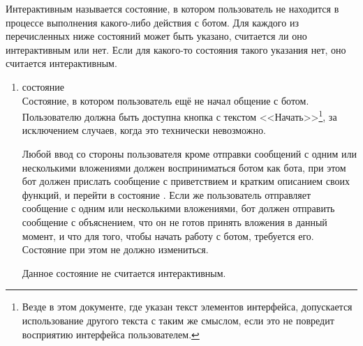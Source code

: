    Интерактивным называется состояние, в котором пользователь не находится в процессе выполнения
    какого-либо действия с ботом. Для каждого из перечисленных ниже состояний может быть указано,
    считается ли оно интерактивным или нет. Если для какого-то состояния такого указания нет,
    оно считается интерактивным.
    \begin{enumerate}
        \item \label{itm:req:ui:states:init}
             состояние \\
            Состояние, в котором пользователь ещё не начал общение с ботом.
            Пользователю должна быть доступна кнопка с текстом <<Начать>>\footnote{
            Везде в этом документе, где указан текст элементов интерфейса, допускается
            использование другого текста с таким же смыслом, если это не повредит восприятию
            интерфейса пользователем.}, за исключением случаев, когда это технически невозможно.

            Любой ввод со стороны пользователя кроме отправки сообщений с одним или несколькими
            вложениями должен восприниматься ботом как  бота, при этом бот должен прислать
            сообщение с приветствием и кратким описанием своих функций, и перейти в состояние
            \hyperref[itm:req:ui:states:mainmenu]{}.
            Если же пользователь отправляет сообщение с одним или несколькими
            вложениями, бот должен отправить сообщение с объяснением, что он не готов принять вложения
            в данный момент, и что для того, чтобы начать работу с ботом, требуется 
            его. Состояние при этом не должно измениться.

            Данное состояние не считается интерактивным.


\end{enumerate}
